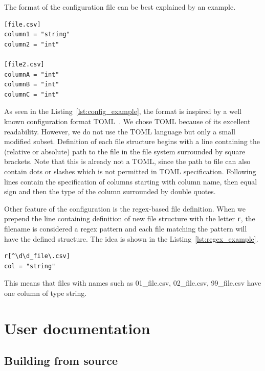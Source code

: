 The format of the configuration file can be best explained by an example.

\begin{lstlisting}[caption=An example configuration file, label={lst:config_example}, captionpos=b]
[file.csv]
column1 = "string"
column2 = "int"

[file2.csv]
columnA = "int"
columnB = "int"
columnC = "int"
\end{lstlisting}

As seen in the Listing~\ref{lst:config_example}, the format is inspired by a well known configuration format
TOML~\cite{toml_spec}.
We chose TOML because of its excellent readability.
However, we do not use the TOML language but only a small modified subset.
Definition of each file structure begins with a line containing the (relative or absolute) path to the file in the file
system surrounded by square brackets.
Note that this is already not a TOML, since the path to file can also contain dots or slashes which is not permitted in
TOML specification.
Following lines contain the specification of columns starting with column name, then equal sign and then the type of the
column surrounded by double quotes.

Other feature of the configuration is the regex-based file definition.
When we prepend the line containing definition of new file structure with the letter \verb|r|, the filename is
considered a regex pattern and each file matching the pattern will have the defined structure.
The idea is shown in the Listing~\ref{lst:regex_example}.

\begin{lstlisting}[caption=An example regex-based file definition, label={lst:regex_example}, captionpos=b]
r[^\d\d_file\.csv]
col = "string"
\end{lstlisting}

This means that files with names such as 01\_file.csv, 02\_file.csv, 99\_file.csv have one column of type string.

\section{User documentation}

\subsection{Building from source}

